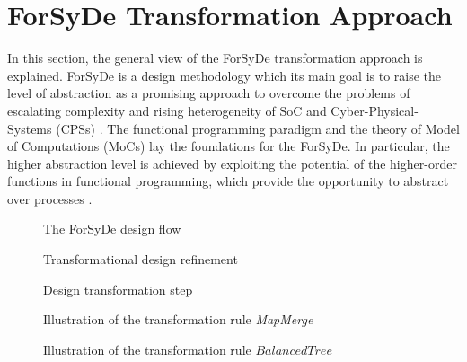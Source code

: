 \section{ForSyDe Transformation Approach}
\label{sec:forsyde-transformation-approach}

In this section, the general view of the ForSyDe transformation approach is explained. ForSyDe is a design methodology which its main goal is to raise the level of abstraction as a promising approach to overcome the problems of escalating complexity and rising heterogeneity of SoC and Cyber-Physical-Systems (CPSs) \cite{sander2017forsyde}. The functional programming paradigm and the theory of Model of Computations (MoCs) lay the foundations for the ForSyDe. In particular, the
higher abstraction level is achieved by exploiting the potential of the higher-order functions in functional programming, which provide the opportunity to abstract over processes \cite{sander2003system}.



\begin{figure}[htbp]
  \centering
  \scalebox{0.7}{}
  \caption{The ForSyDe design flow}
  \label{fig:forsyde-transformational-design-flow}
\end{figure}


\begin{figure}[htbp]
  \centering
  
  \caption{Transformational design refinement}
  \label{fig:transformational-design-refinement}
\end{figure}

\begin{figure}[htb]
  \centering
  
  \caption{Design transformation step}
  \label{fig:design-transformation step}
\end{figure}

\begin{figure}[htbp]
  \centering
  
  \caption{Illustration of the transformation rule \textit{MapMerge}}
  \label{fig:map-merge}
\end{figure}

\begin{figure}[htbp]
  \centering
  \scalebox{0.8}{}
  \caption{Illustration of the transformation rule $\mathit{BalancedTree}$}
  \label{fig:balanced-tree}
\end{figure}

